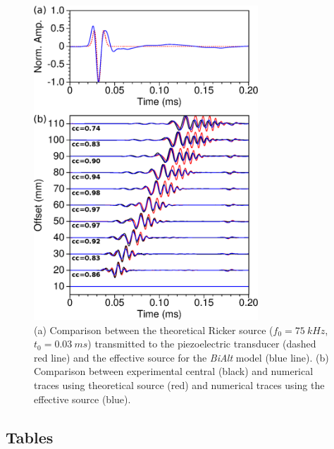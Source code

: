 \documentclass[manuscript,revised]{geophysics}
\newcommand{\bialt}{\textit{BiAlt} }
\begin{document}


\begin{figure}[!h]
\centering
\includegraphics[width=0.75\textwidth]{fig/panel_bialt_lswe.eps}
\caption{(a) Comparison between the theoretical Ricker source ($f_{0}=75\ kHz$, $t_{0}=0.03\ ms$) transmitted to the piezoelectric transducer (dashed red line) and the effective source for the \bialt model (blue line). (b) Comparison between experimental central (black) and numerical traces using theoretical source (red) and numerical traces using the effective source (blue). }
\label{blind-test}
\end{figure}

\clearpage
\newpage

\subsection*{Tables}
\end{document}
